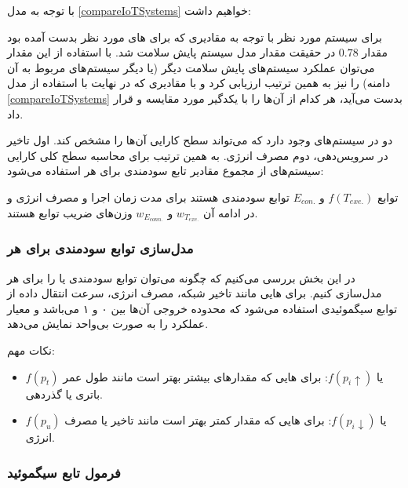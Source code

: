 با توجه به مدل \ref{compareIoTSystems} خواهیم داشت:


برای سیستم مورد نظر با توجه به مقادیری که برای های مورد نظر بدست آمده
بود مقدار $0.78$ در حقیقت مقدار مدل سیستم پایش سلامت شد. با استفاده از این مقدار
می‌توان عملکرد سیستم‌های پایش سلامت دیگر (یا دیگر سیستم‌های  مربوط به آن
دامنه) را نیز به همین ترتیب ارزیابی کرد و با مقادیری که در نهایت با استفاده از
مدل \ref{compareIoTSystems} بدست می‌آید، هر کدام از آن‌ها را با یکدگیر مورد
مقایسه و  قرار داد.

دو  در سیستم‌های  وجود دارد که می‌تواند سطح کارایی آن‌ها را مشخص
کند. اول تاخیر در سرویس‌دهی، دوم مصرف انرژی. به همین ترتیب برای محاسبه سطح کلی
کارایی سیستم‌های  از مجموع مقادیر تابع سودمندی برای هر 
استفاده می‌شود:


توابع $f(T_{exe.})$ و $E_{con.}$ توابع سودمندی هستند برای مدت زمان اجرا و
مصرف انرژی و در ادامه آن $w_{T_{exe.}}$ و $w_{E_{conn.}}$ وزن‌های ضریب توابع
هستند.

\subsubsection{مدل‌سازی توابع سودمندی برای هر }

در این بخش بررسی می‌کنیم که چگونه می‌توان توابع سودمندی یا  را برای هر  مدل‌سازی کنیم. برای هایی مانند تاخیر
شبکه، مصرف انرژی، سرعت انتقال داده از توابع سیگموئیدی استفاده می‌شود که محدوده
خروجی آن‌ها بین ۰ و ۱ می‌باشد و معیار عملکرد  را به صورت بی‌واحد نمایش
می‌دهد.

نکات مهم:

\begin{itemize}
    \item $f(p_t)$ یا $f(p_i \uparrow)$: برای هایی که مقدار‌‌های بیشتر
    بهتر است مانند طول عمر باتری یا گذردهی.
    \item $f(p_u)$ یا $f(p_i \downarrow)$: برای هایی که مقدار کمتر بهتر
    است مانند تاخیر یا مصرف انرژی.
\end{itemize}

\subsubsection{فرمول تابع سیگموئید}

